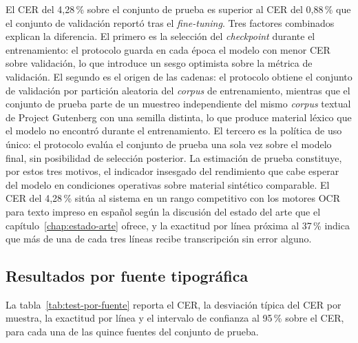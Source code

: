 El CER del 4,28\,\% sobre el conjunto de prueba es superior al CER del 0,88\,\% que el conjunto de validación reportó tras el \textit{fine-tuning}. Tres factores combinados explican la diferencia. El primero es la selección del \textit{checkpoint} durante el entrenamiento: el protocolo guarda en cada época el modelo con menor CER sobre validación, lo que introduce un sesgo optimista sobre la métrica de validación. El segundo es el origen de las cadenas: el protocolo obtiene el conjunto de validación por partición aleatoria del \textit{corpus} de entrenamiento, mientras que el conjunto de prueba parte de un muestreo independiente del mismo \textit{corpus} textual de Project Gutenberg con una semilla distinta, lo que produce material léxico que el modelo no encontró durante el entrenamiento. El tercero es la política de uso único: el protocolo evalúa el conjunto de prueba una sola vez sobre el modelo final, sin posibilidad de selección posterior. La estimación de prueba constituye, por estos tres motivos, el indicador insesgado del rendimiento que cabe esperar del modelo en condiciones operativas sobre material sintético comparable. El CER del 4,28\,\% sitúa al sistema en un rango competitivo con los motores OCR para texto impreso en español según la discusión del estado del arte que el capítulo~\ref{chap:estado-arte} ofrece, y la exactitud por línea próxima al 37\,\% indica que más de una de cada tres líneas recibe transcripción sin error alguno.

\subsection{Resultados por fuente tipográfica}
\label{subsec:test-por-fuente}

La tabla~\ref{tab:test-por-fuente} reporta el CER, la desviación típica del CER por muestra, la exactitud por línea y el intervalo de confianza al 95\,\% sobre el CER, para cada una de las quince fuentes del conjunto de prueba.

